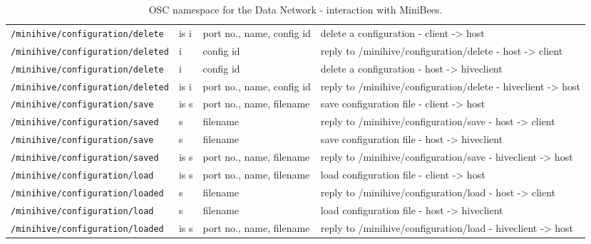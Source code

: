 \documentclass[letterpaper,10pt]{article}
\begin{document}
\begin{sidewaystable}[!tbp]
\begin{center}
\begin{tabular}{|llll|}
\verb|/minihive/configuration/delete| & is i & port no., name, config id & delete a configuration - client -> host\\
\verb|/minihive/configuration/deleted| & i & config id & reply to /minihive/configuration/delete -  host -> client\\
\verb|/minihive/configuration/delete| & i & config id & delete a configuration  - host -> hiveclient\\
\verb|/minihive/configuration/deleted| & is i & port no., name, config id & reply to /minihive/configuration/delete - hiveclient -> host\\
\hline
\verb|/minihive/configuration/save| & is s & port no., name, filename & save configuration file - client -> host\\
\verb|/minihive/configuration/saved| & s & filename & reply to /minihive/configuration/save - host -> client\\
\verb|/minihive/configuration/save| & s & filename &  save configuration file -  host -> hiveclient\\
\verb|/minihive/configuration/saved| & is s & port no., name, filename & reply to /minihive/configuration/save - hiveclient -> host\\

\verb|/minihive/configuration/load| & is s & port no., name, filename & load configuration file - client -> host\\
\verb|/minihive/configuration/loaded| & s & filename & reply to /minihive/configuration/load - host -> client\\
\verb|/minihive/configuration/load| & s & filename &  load configuration file -  host -> hiveclient\\
\verb|/minihive/configuration/loaded| & is s & port no., name, filename & reply to /minihive/configuration/load - hiveclient -> host\\

\hline

\end{tabular}
\end{center}
\caption{OSC namespace for the Data Network - interaction with MiniBees. }
\label{oscinterfaceMB}
 \end{sidewaystable}
\end{document}
